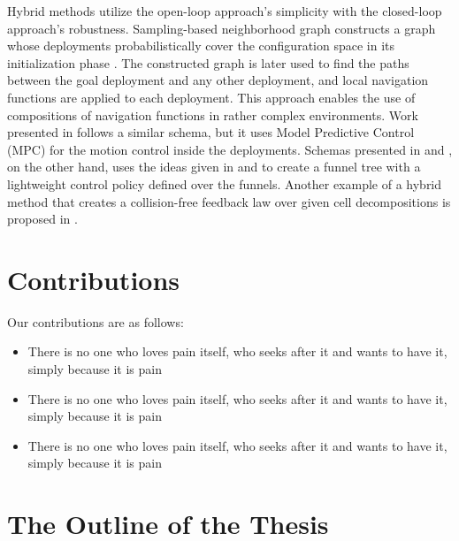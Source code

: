 Hybrid methods utilize the open-loop approach's simplicity with the closed-loop approach's robustness.
Sampling-based neighborhood graph constructs a graph whose deployments probabilistically cover the configuration space in its initialization phase \cite{sng2004}.
The constructed graph is later used to find the paths between the goal deployment and any other deployment, and local navigation functions are applied to each deployment.
This approach enables the use of compositions of navigation functions in rather complex environments. Work presented in \cite{karagoz2020MpcGraph} follows a similar schema, but it uses Model Predictive Control (MPC) for the motion control inside the deployments.
Schemas presented in \cite{golbol2018RGTrees} and \cite{Ege2019}, on the other hand, uses the ideas given in \cite{Burridge1999SequentialComposition} and \cite{rrt2001} to create a funnel tree with a lightweight control policy defined over the funnels.
Another example of a hybrid method that creates a collision-free feedback law over given cell decompositions is proposed in \cite{Lindemann2009}.

\section{Contributions}
\label{section:contributions}

Our contributions are as follows:

\begin{itemize}
    \item There is no one who loves pain itself, who seeks after it and wants to have it, simply because it is pain
    \item There is no one who loves pain itself, who seeks after it and wants to have it, simply because it is pain
    \item There is no one who loves pain itself, who seeks after it and wants to have it, simply because it is pain
\end{itemize}

\section{The Outline of the Thesis}
\label{section:outline}
\lipsum[1-3]
